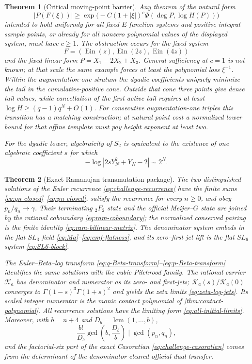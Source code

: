 \documentclass[11pt]{article}
\newtheorem{theorem}{Theorem}[section]
\theoremstyle{definition}
\theoremstyle{remark}
\newcommand{\Ein}{\operatorname{Ein}}
\newcommand{\lcm}{\operatorname{lcm}}
\begin{document}
\begin{theorem}[Critical moving-point barrier]
\label{thm:intro-barrier}
Any theorem of the natural form
\[
 |P(F(\xi))|\ge
 \exp\!\bigl(-C(1+|\xi|)^c\Phi(\deg P,\log H(P))\bigr)
\]
intended to hold uniformly for all fixed \(E\)-function systems and positive
integral sample points, or already for all nonzero polynomial values of the
displayed system, must have \(c\ge1\).  The obstruction occurs for the fixed
system
\[
 F=(\Ein(z),\Ein(2z),\Ein(4z))
\]
and the fixed linear form \(P=X_1-2X_2+X_3\).  General sufficiency at
\(c=1\) is not known; at that scale the same example forces at least the
polynomial loss \(\xi^{-1}\).  Within the augmentation-one stratum the
dyadic coefficients uniquely minimize the tail in the cumulative-positive
cone.  Outside that cone three points give dense tail values, while
cancellation of the first active tail requires at least
\(\log H\ge(q-1)q^N+O(1)\).  For consecutive augmentation-one triples this
transition has a matching construction; at natural point cost a normalized
lower bound for that affine template must pay height exponent at least two.

For the dyadic tower, algebraicity of \(S_2\) is
equivalent to the existence of one algebraic coefficient \(s\) for which
\[
 -\log|2sY_N^2+Y_N-2|\sim2^N.
\]
\end{theorem}

\begin{theorem}[Exact Ramanujan transmutation package]
\label{thm:intro-recurrence}
The two distinguished solutions of the Euler recurrence
\eqref{eq:challenge-recurrence} have the finite sums
\eqref{eq:qn-closed}--\eqref{eq:pn-closed}, satisfy the recurrence for every
\(n\ge0\), and obey \(p_n/q_n\to\gamma\).  Their terminating
\({}_2F_2\) state and the official Meijer--\(G\) state are joined by the
rational coboundary \eqref{eq:ram-coboundary}; the normalized conserved
pairing is the finite identity \eqref{eq:ram-bilinear-matrix}.  The
denominator system embeds in the flat \(SL_3\) field
\eqref{eq:Ma}--\eqref{eq:cmf-flatness}, and its zero--first jet lift is the
flat \(SL_6\) system \eqref{eq:SL6-block}.

The Euler--Beta--log transform
\eqref{eq:q-Beta-transform}--\eqref{eq:p-Beta-transform} identifies the
same solutions with the cubic Pilehrood family.  The rational carrier
\(\mathscr K_a\) has denominator and numerator as its zero- and first-jets;
\(\mathscr K_a(s)/\mathscr K_a(0)\) converges to
\(\Gamma(1-s)^3\Gamma(1+s)^2\) and yields the zeta limits
\eqref{eq:zeta-log-jets}.  Its scaled integer numerator is the monic contact
polynomial of \cref{thm:contact-polynomial}.  All recurrence solutions have
the limiting form \eqref{eq:all-initial-limits}.  Moreover, with
\(b=n+4\) and \(D_b=\lcm(1,\ldots,b)\),
\[
 \frac{b!}{D_b}\gcd\!\left(b,\frac{D_b}{b}\right)
 \mid\gcd(p_n,q_n),
\]
and the factorial-six part of the exact Casoratian
\eqref{eq:challenge-casoratian} comes from the determinant of the
denominator-cleared official dual transfer.
\end{theorem}
\end{document}
